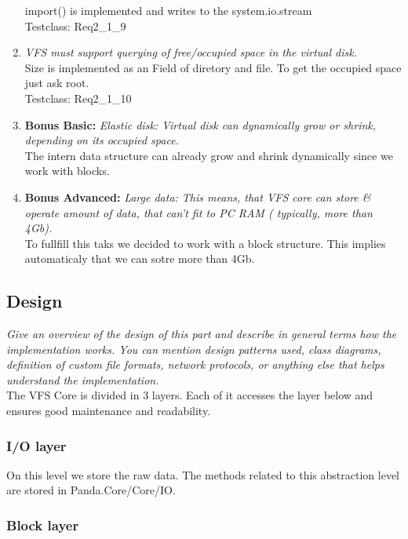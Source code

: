 \documentclass[a4paper,12pt]{article}
\begin{document}
\begin{enumerate}
		import() is implemented and writes to the system.io.stream\\
		Testclass: Req2\_1\_9
	\item \emph{VFS must support querying of free/occupied space in the virtual disk.}\\
		Size is implemented as an Field of diretory and file. To get the occupied space just ask root.\\
		Testclass: Req2\_1\_10
	\item \textbf{Bonus Basic:} \emph{Elastic disk: Virtual disk can dynamically grow or shrink, depending on its occupied space.}\\
		The intern data structure can already grow and shrink dynamically since we work with blocks.
	\item \textbf{Bonus Advanced:} \emph{Large data: This means, that VFS core can store \& operate amount of data, that can't fit to PC RAM ( typically, more than 4Gb).}\\
		To fullfill this taks we decided to work with a block structure. This implies automaticaly that we can sotre more than 4Gb.\\
\end{enumerate}

\subsection{Design}

\emph{Give an overview of the design of this part and describe in general terms how the implementation works. You can mention design patterns used, class diagrams, definition of custom file formats, network protocols, or anything else that helps understand the implementation.}\\

The VFS Core is divided in 3 layers. Each of it accesses the layer below and ensures good maintenance and readability.

\subsubsection{I/O layer}

On this level we store the raw data. The methods related to this abstraction level are stored in Panda.Core/Core/IO.

\subsubsection{Block layer}
\end{document}
